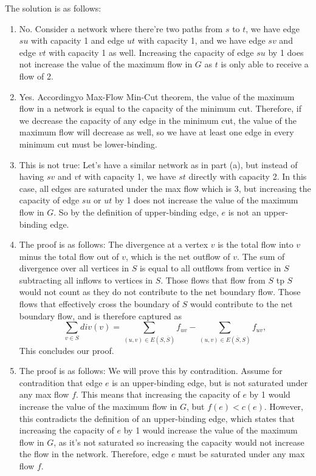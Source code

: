 \documentclass[10pt]{article}
\begin{document}
\begin{solution}
The solution is as follows:
    \begin{enumerate}
        \item  No. Consider a network where there're two paths from $s$ to $t$, we have edge $su$ with capacity 1 and edge $ut$ with capacity 1, and we have edge $sv$ and edge $vt$ with capacity 1 as well. Increasing the capacity of edge $su$ by 1 does not increase the value of the maximum flow in $G$ as $t$ is only able to receive a flow of 2.
        \item Yes. Accordingyo Max-Flow Min-Cut theorem, the value of the maximum flow in a network is equal to the capacity of the minimum cut. Therefore, if we decrease the capacity of any edge in the minimum cut, the value of the maximum flow will decrease as well, so we have at least one edge in every minimum cut must be lower-binding.
        \item This is not true: Let's have a similar network as in part (a), but instead of having $sv$ and $vt$ with capacity 1, we have $st$ directly with capacity 2. In this case, all edges are saturated under the max flow which is 3, but increasing the capacity of edge $su$ or $ut$ by 1 does not increase the value of the maximum flow in $G$. So by the definition of upper-binding edge, $e$ is not an upper-binding edge.
        \item The proof is as follows: The divergence at a vertex $v$ is the total flow into $v$ minus the total flow out of $v$, which is the net outflow of $v$. The sum of divergence over all vertices in $S$ is equal to all outflows from vertice in $S$ subtracting all inflows to vertices in $S$. Those flows that flow from $S$ tp $S$ would not count as they do not contribute to the net boundary flow. Those flows that effectively cross the boundary of $S$ would contribute to the net boundary flow, and is therefore captured as 
        \[
        \sum_{v \in S} div(v) = \sum_{(u,v) \in E(S,\overline{S})} f_{uv} - \sum_{(u,v) \in E(\overline{S},S)} f_{uv},
    \] This concludes our proof.
        \item The proof is as follows: We will prove this by contradition.
        Assume for contradition that edge $e$ is an upper-binding edge, but is not saturated under any max flow $f$. This means that increasing the capacity of $e$ by 1 would increase the value of the maximum flow in $G$, but $f(e) < c(e)$. However, this contradicts the definition of an upper-binding edge, which states that increasing the capacity of $e$ by 1 would increase the value of the maximum flow in $G$,  as it's not saturated so increasing the capacity would not increase the flow in the network. Therefore, edge $e$ must be saturated under any max flow $f$.
    \end{enumerate}
\end{solution}
\end{document}
